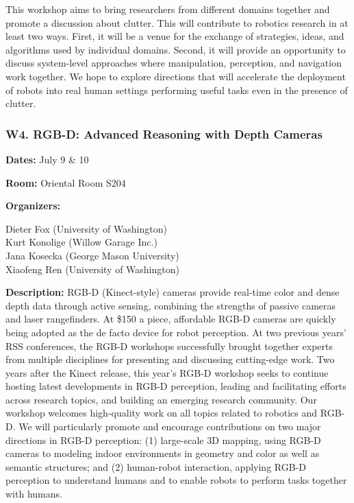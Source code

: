 This workshop aims to bring researchers from different domains together and promote a discussion about clutter. This will contribute to robotics research in at least two ways. First, it will be a venue for the exchange of strategies, ideas, and algorithms used by individual domains. Second, it will provide an opportunity to discuss system-level approaches where manipulation, perception, and navigation work together. We hope to explore directions that will accelerate the deployment of robots into real human settings performing useful tasks even in the presence of clutter.


\subsubsection*{  W4.   RGB-D: Advanced Reasoning with Depth Cameras}

{\bf Dates:} July 9 \& 10


{\bf Room:} Oriental Room S204

\bigskip
{\bf Organizers:}

Dieter Fox (University of Washington)\\
Kurt Konolige (Willow Garage Inc.)\\
Jana Kosecka (George Mason University)\\
Xiaofeng Ren (University of Washington)

\bigskip
{\bf Description:}
RGB-D (Kinect-style) cameras provide real-time color and dense depth data through active sensing, combining the strengths of passive cameras and laser rangefinders. At \$150 a piece, affordable RGB-D cameras are quickly being adopted as the de facto device for robot perception. At two previous years' RSS conferences, the RGB-D workshops successfully brought together experts from multiple disciplines for presenting and discussing cutting-edge work. Two years after the Kinect release, this year's RGB-D workshop seeks to continue hosting latest developments in RGB-D perception, leading and facilitating efforts across research topics, and building an emerging research community.
Our workshop welcomes high-quality work on all topics related to robotics and RGB-D. We will particularly promote and encourage contributions on two major directions in RGB-D perception: (1) large-scale 3D mapping, using RGB-D cameras to modeling indoor environments in geometry and color as well as semantic structures; and (2) human-robot interaction, applying RGB-D perception to understand humans and to enable robots to perform tasks together with humans.

